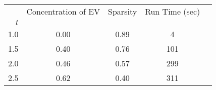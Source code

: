 \begin{tabular}{r|cccc}
\toprule
{} &  Concentration of EV &  Sparsity & Run Time (sec) \\
$t$ &                      &           &                \\
\midrule
1.0 &                 0.00 &      0.89 &              4 \\
1.5 &                 0.40 &      0.76 &            101 \\
2.0 &                 0.46 &      0.57 &            299 \\
2.5 &                 0.62 &      0.40 &            311 \\
\bottomrule
\end{tabular}
